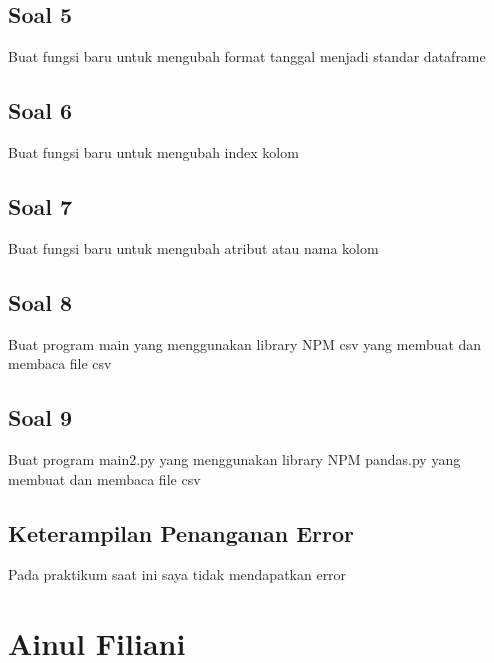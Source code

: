 \subsection{Soal 5}
Buat fungsi baru untuk mengubah format tanggal menjadi standar dataframe


\subsection{Soal 6}
Buat fungsi baru  untuk mengubah index kolom


\subsection{Soal 7}
Buat fungsi baru untuk mengubah atribut atau nama kolom


\subsection{Soal 8}
Buat program main yang menggunakan library NPM csv yang membuat dan membaca file csv




\subsection{Soal 9}
Buat program main2.py yang menggunakan library NPM pandas.py yang membuat dan membaca file csv



\subsection{Keterampilan Penanganan Error}
Pada praktikum saat ini saya tidak mendapatkan error


\section{Ainul Filiani}

